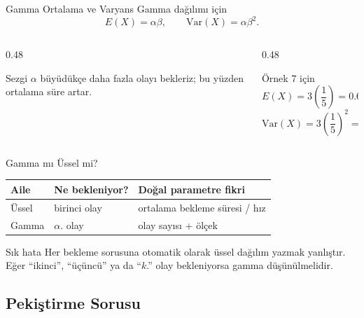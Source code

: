 \documentclass[light]{lutbeamer}
\begin{document}
\begin{frame}{Gamma Ortalama ve Varyans}
    \small
    Gamma dağılımı için
    \[
    E(X)=\alpha\beta,
    \qquad
    \mathrm{Var}(X)=\alpha\beta^2.
    \]

    \begin{columns}[T]
        \begin{column}{0.48\textwidth}
            \begin{block}{Sezgi}
                \(\alpha\) büyüdükçe daha fazla olayı bekleriz; bu yüzden ortalama süre artar.
            \end{block}
        \end{column}
        \begin{column}{0.48\textwidth}
            \begin{exampleblock}{Örnek 7 için}
                \[
                E(X)=3\left(\frac{1}{5}\right)=0.6 \text{ dakika}
                \]
                \[
                \mathrm{Var}(X)=3\left(\frac{1}{5}\right)^2=0.12.
                \]
            \end{exampleblock}
        \end{column}
    \end{columns}
\end{frame}

\begin{frame}{Gamma mı Üssel mi?}
    \small
    \begin{center}
        \begin{tabular}{@{}lll@{}}
            \toprule
            \textbf{Aile} & \textbf{Ne bekleniyor?} & \textbf{Doğal parametre fikri} \\ \midrule
            Üssel & birinci olay & ortalama bekleme süresi / hız \\
            Gamma & \(\alpha\). olay & olay sayısı + ölçek \\ \bottomrule
        \end{tabular}
    \end{center}

    \begin{alertblock}{Sık hata}
        Her bekleme sorusuna otomatik olarak üssel dağılım yazmak yanlıştır.
        Eğer ``ikinci'', ``üçüncü'' ya da ``\(k\).'' olay bekleniyorsa gamma düşünülmelidir.
    \end{alertblock}
\end{frame}

\subsection{Pekiştirme Sorusu}
\end{document}
